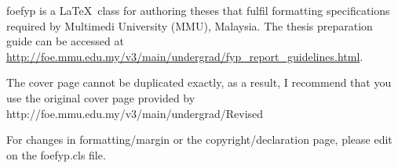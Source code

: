 \textsf{foefyp} is a \LaTeX\ class for authoring theses that fulfil formatting specifications required by Multimedi University (MMU), Malaysia. The thesis preparation guide can be accessed at \url{http://foe.mmu.edu.my/v3/main/undergrad/fyp_report_guidelines.html}.

The cover page cannot be duplicated exactly, as a result, I recommend that you use the original cover page provided by http://foe.mmu.edu.my/v3/main/undergrad/Revised%

For changes in formatting/margin or the copyright/declaration page, please edit on the foefyp.cls file.


